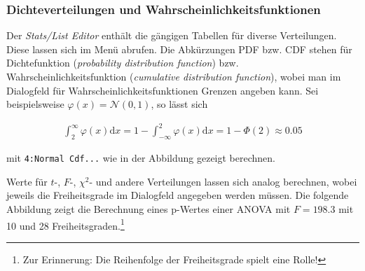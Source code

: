\documentclass[a4paper,11pt,notitlepage,halfparskip,headsepline,normalheadings,twoside]{scrartcl}
\newlength{\tikey}
\newcommand{\keystroke}[1]{\settowidth{\tikey}{\scriptsize #1}\psframebox[framearc=0.2]{\parbox{\tikey}{\scriptsize\textsf{#1}}}}
\begin{document}
\subsubsection{Dichteverteilungen und Wahrscheinlichkeitsfunktionen}
\begin{window}
Der  \textit{Stats/List Editor} enthält die gängigen Tabellen für diverse
Verteilungen. Diese lassen sich im Menü \keystroke{F5} abrufen. Die Abkürzungen
PDF bzw. CDF stehen für Dichtefunktion (\textit{probability distribution
function}) bzw. Wahrscheinlichkeitsfunktion (\textit{cumulative distribution
function}), wobei man im Dialogfeld für Wahrscheinlichkeitsfunktionen
Grenzen angeben kann. Sei beispielsweise $\varphi(x)=\mathcal{N}(0,1)$, so lässt sich 

\begin{eqnarray*}
\int_{2}^{\infty}\varphi(x)\mathrm{d}x=1-\int_{-\infty}^{2}\varphi(x)\mathrm{d}x=1-\Phi(2)\approx
0.05
 \end{eqnarray*}

mit \texttt{4:Normal Cdf...} wie in der Abbildung gezeigt berechnen.
\end{window}

Werte für $t$-, $F$-, $\chi^2$- und andere Verteilungen lassen sich analog
berechnen, wobei jeweils die Freiheitsgrade im Dialogfeld angegeben werden
müssen. Die folgende Abbildung zeigt die Berechnung eines p-Wertes einer ANOVA
mit $F=198.3$ mit 10 und 28 Freiheitsgraden.\footnote{Zur Erinnerung: Die Reihenfolge der
Freiheitsgrade spielt eine Rolle!}
\end{document}

